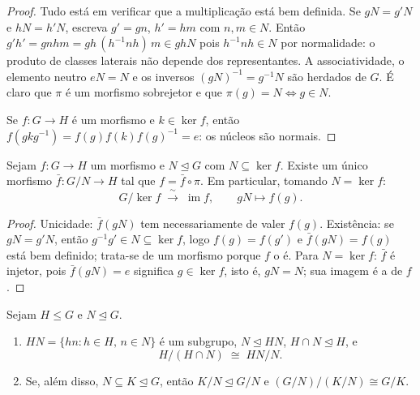 \begin{proof}
Tudo está em verificar que a multiplicação está bem definida. Se $gN = g'N$ e
$hN = h'N$, escreva $g' = gn$, $h' = hm$ com $n, m \in N$. Então $g'h' = gnhm =
gh\,(h^{-1}nh)\,m \in ghN$ pois $h^{-1}nh \in N$ por
normalidade: o produto de classes laterais não depende dos
representantes. A associatividade, o elemento neutro $eN = N$ e os
inversos $(gN)^{-1} = g^{-1}N$ são herdados de $G$. É claro que $\pi$ é um morfismo
sobrejetor e que $\pi(g) = N \iff g \in N$.

Se $f \colon G \to H$ é um morfismo e $k \in \ker f$, então $f(gkg^{-1}) = f(g)f(k)f(g)^{-1} = e$: os núcleos são normais.
\end{proof}

\begin{theorem}
\label{thm:b3:groups:firstiso}
Sejam $f \colon G \to H$ um morfismo e $N \trianglelefteq G$ com $N \subseteq \ker f$. Existe um único morfismo $\bar f \colon G/N
\to H$
tal que $f = \bar f \circ \pi$. Em particular, tomando $N = \ker
f$:
\[
G/\ker f \;\xrightarrow{\;\sim\;}\; \operatorname{im} f,
\qquad gN \mapsto f(g).
\]
\end{theorem}

\begin{proof}
Unicidade: $\bar f(gN)$ tem necessariamente de valer $f(g)$. Existência: se
$gN = g'N$, então $g^{-1}g' \in N \subseteq \ker f$, logo $f(g) = f(g')$ e $\bar
f(gN) = f(g)$ está bem definido; trata-se de um
morfismo porque $f$ o é. Para $N = \ker f$: $\bar f$ é injetor, pois
$\bar f(gN) = e$ significa $g \in \ker f$, isto é, $gN = N$; sua imagem é a de $f$.
\end{proof}

\begin{theorem}
\label{thm:b3:groups:secondiso}
Sejam $H \leq G$ e $N \trianglelefteq G$.
\begin{enumerate}
  \item $HN = \{hn : h \in H,\, n \in N\}$ é um subgrupo, $N
        \trianglelefteq HN$, $H \cap N \trianglelefteq H$, e
        \[
        H/(H \cap N) \;\cong\; HN/N .
        \]
  \item Se, além disso, $N \subseteq K \trianglelefteq G$, então $K/N
        \trianglelefteq G/N$ e $(G/N)\big/(K/N) \cong G/K$.
\end{enumerate}
\end{theorem}

